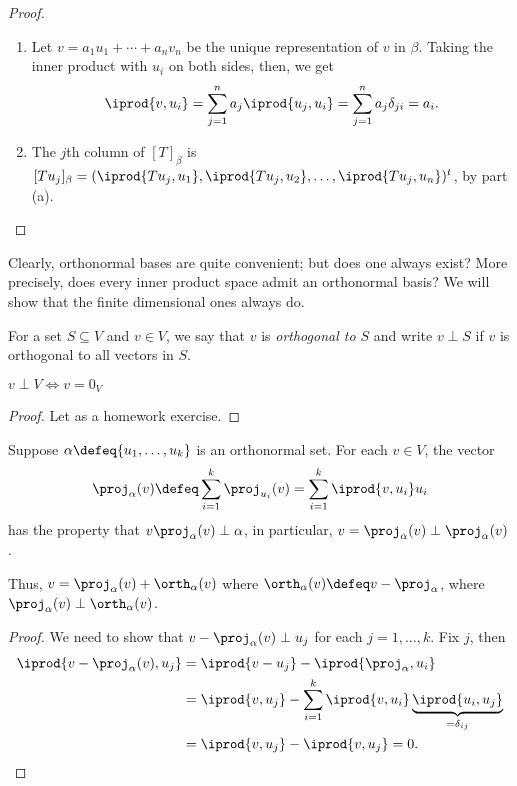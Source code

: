 \begin{proof}
    \begin{enumerate}[label=(\alph*)]
        \item Let $v = a_1 u_1 + \cdots + a_n v_n$ be the unique representation of $v$ in $\beta$. Taking the inner product with $u_i$ on both sides, then, we get \[
            \iprod{v, u_i} = \sum_{j=1}^n a_j \iprod{u_j, u_i} = \sum_{j=1}^n a_j \delta_{ji} = a_i.
        \]
        \item The $j$th column of $[T]_\beta$ is $[Tu_j]_\beta = (\iprod{Tu_j, u_1}, \iprod{Tu_j, u_2}, \dots, \iprod{Tu_j, u_n})^t$, by part (a).
    \end{enumerate}
\end{proof}


Clearly, orthonormal bases are quite convenient; but does one always exist? More precisely, does every inner product space admit an orthonormal basis? We will show that the finite dimensional ones always do.

\begin{definition}
    For a set $S \subseteq V$ and $v \in V$, we say that $v$ is \emph{orthogonal to $S$} and write $v \perp S$ if $v$ is orthogonal to all vectors in $S$.
\end{definition}

\begin{proposition}
    $v \perp V \iff v = 0_V$
\end{proposition}

\begin{proof}
    Let as a homework exercise.
\end{proof}

\begin{lemma}\label{lemma:orthonormalsetproj}
    Suppose $\alpha \defeq \{u_1, \dots, u_k\}$ is an orthonormal set. For each $v \in V$, the vector $$\proj_\alpha(v) \defeq \sum_{i=1}^k \proj_{u_i}(v) = \sum_{i=1}^k \iprod{v, u_i} u_i$$ has the property that $v \proj_\alpha(v) \perp \alpha$, in particular, $v = \proj_\alpha(v) \perp \proj_\alpha(v)$.

    Thus, $v = \proj_\alpha(v) + \orth_\alpha(v)$ where $\orth_\alpha(v) \defeq v - \proj_\alpha$, where $\proj_\alpha(v) \perp \orth_\alpha(v)$.
\end{lemma}

\begin{proof}
    We need to show that $v - \proj_\alpha(v) \perp u_j$ for each $j = 1, \dots, k$. Fix $j$, then \begin{align*}
        \iprod{v - \proj_\alpha(v), u_j} &= \iprod{v -u_j} - \iprod{\proj_\alpha, u_i}\\
        &= \iprod{v, u_j} - \sum_{i=1}^k\iprod{v, u_i} \underbrace{\iprod{u_i, u_j}}_{=\delta_{ij}} \\
        &= \iprod{v, u_j} - \iprod{v, u_j} = 0.
    \end{align*}
\end{proof}

